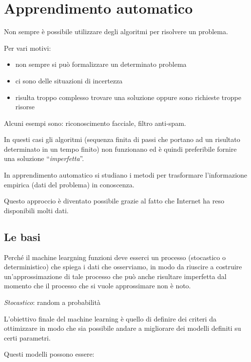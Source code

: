 \section{Apprendimento automatico}\label{apprendimento-automatico}

Non sempre è possibile utilizzare degli algoritmi per risolvere un
problema.

Per vari motivi:

\begin{itemize}
\item
  non sempre si può formalizzare un determinato problema
\item
  ci sono delle situazioni di incertezza
\item
  risulta troppo complesso trovare una soluzione oppure sono richieste
  troppe risorse
\end{itemize}

Alcuni esempi sono: riconoscimento facciale, filtro anti-spam.

In questi casi gli algoritmi (sequenza finita di passi che portano ad un
risultato determinato in un tempo finito) non funzionano ed è quindi
preferibile fornire una soluzione ``\emph{imperfetta}''.

In apprendimento automatico si studiano i metodi per trasformare
l'informazione empirica (dati del problema) in conoscenza.

Questo approccio è diventato possibile grazie al fatto che Internet ha
reso disponibili molti dati.

\subsection{Le basi}\label{le-basi}

Perché il machine leargning funzioni deve esserci un processo
(stocastico o deterministico) che spiega i dati che osserviamo, in modo
da riuscire a costruire un'approssimazione di tale processo che può
anche risultare imperfetta dal momento che il processo che si vuole
approssimare non è noto.

\emph{Stocastico}: random a probabilità

L'obiettivo finale del machine learning è quello di definire dei criteri
da ottimizzare in modo che sia possibile andare a migliorare dei modelli
definiti su certi parametri.

Questi modelli possono essere:

